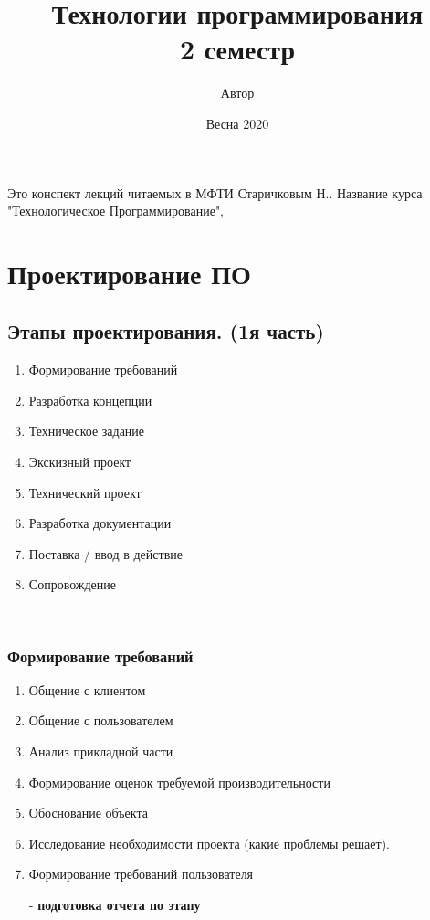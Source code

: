 \documentclass[12pt; a4paper]{book}
\begin{document}
 

\frontmatter
\title{Технологии программирования\\ 2 семестр}
\author{Автор} 
\date{Весна 2020}
\maketitle
Это конспект лекций читаемых в МФТИ Старичковым Н.. Название курса "Технологическое Программирование", 
\tableofcontents

\mainmatter
\chapter{Проектирование ПО}

\section{Этапы проектирования. (1я часть)}
\begin{enumerate}
\item Формирование требований
\item Разработка концепции
\item Техническое задание
\item Экскизный проект
\item Технический проект
\item Разработка документации
\item Поставка / ввод в действие
\item Сопровождение
\end{enumerate}\

\subsection{Формирование требований}
\begin{enumerate}
\item Общение с клиентом
\item Общение с пользователем
\item Анализ прикладной части
\item Формирование оценок требуемой производительности
\item Обоснование объекта
\item Исследование необходимости проекта (какие проблемы решает).
\item Формирование требований пользователя
\item[-] \textbf{подготовка отчета по этапу}
\end{enumerate}
\end{document}
